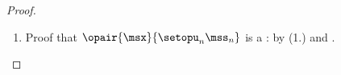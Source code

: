 \begin{proof}
\begin{enumerate}
  \item Proof that $\opair{\msx}{\setopu_n \mss_n}$ is a : 
        by (1.) and .
\end{enumerate}
\end{proof}


